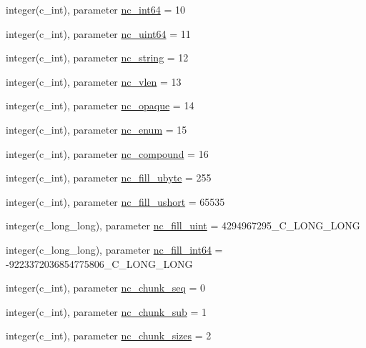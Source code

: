 \begin{DoxyCompactItemize}
\item 
integer(c\+\_\+int), parameter \hyperlink{namespacenetcdf__nc__data_adc6c029282e0811fc416812aa43411f6}{nc\+\_\+int64} = 10
\item 
integer(c\+\_\+int), parameter \hyperlink{namespacenetcdf__nc__data_a94f8f441963ecaa1fb1cecf853bcddd0}{nc\+\_\+uint64} = 11
\item 
integer(c\+\_\+int), parameter \hyperlink{namespacenetcdf__nc__data_a3d18f6f718959b79be4c3ccb6dbd9808}{nc\+\_\+string} = 12
\item 
integer(c\+\_\+int), parameter \hyperlink{namespacenetcdf__nc__data_a1a20bd329e3b1882d7d52cd5699b7dbd}{nc\+\_\+vlen} = 13
\item 
integer(c\+\_\+int), parameter \hyperlink{namespacenetcdf__nc__data_abce6e1a73832a59433f241cc7f21de62}{nc\+\_\+opaque} = 14
\item 
integer(c\+\_\+int), parameter \hyperlink{namespacenetcdf__nc__data_a9c53316bfb47f707160a68ad96edeb25}{nc\+\_\+enum} = 15
\item 
integer(c\+\_\+int), parameter \hyperlink{namespacenetcdf__nc__data_ae85ca0e45c6a67921086f2d06cb1137e}{nc\+\_\+compound} = 16
\item 
integer(c\+\_\+int), parameter \hyperlink{namespacenetcdf__nc__data_a444c1544828d5f1cf2142edd99b1199c}{nc\+\_\+fill\+\_\+ubyte} = 255
\item 
integer(c\+\_\+int), parameter \hyperlink{namespacenetcdf__nc__data_a263f4c0d24540e63c5d338f31269ce58}{nc\+\_\+fill\+\_\+ushort} = 65535
\item 
integer(c\+\_\+long\+\_\+long), parameter \hyperlink{namespacenetcdf__nc__data_a9a577b330e1ae120d78660244b6c2c46}{nc\+\_\+fill\+\_\+uint} = 4294967295\+\_\+\+C\+\_\+\+L\+O\+N\+G\+\_\+\+L\+O\+NG
\item 
integer(c\+\_\+long\+\_\+long), parameter \hyperlink{namespacenetcdf__nc__data_aa0b028ba0ee00c98200b755848afd9fe}{nc\+\_\+fill\+\_\+int64} = -\/9223372036854775806\+\_\+\+C\+\_\+\+L\+O\+N\+G\+\_\+\+L\+O\+NG
\item 
integer(c\+\_\+int), parameter \hyperlink{namespacenetcdf__nc__data_a670a88cd85c6946569dcdb77944759f2}{nc\+\_\+chunk\+\_\+seq} = 0
\item 
integer(c\+\_\+int), parameter \hyperlink{namespacenetcdf__nc__data_afce183a7c44aa40a43748ee186f35bc4}{nc\+\_\+chunk\+\_\+sub} = 1
\item 
integer(c\+\_\+int), parameter \hyperlink{namespacenetcdf__nc__data_ab2ad4eae132b6b45524488d5403a514f}{nc\+\_\+chunk\+\_\+sizes} = 2
\item 

\end{DoxyCompactItemize}
